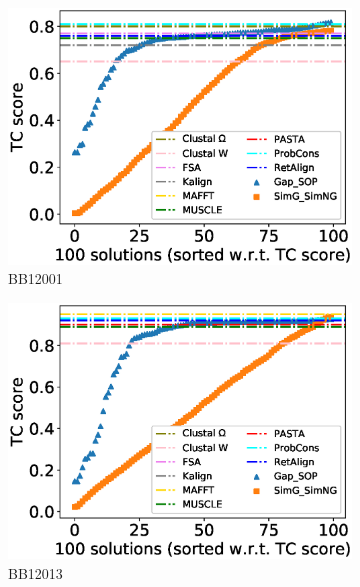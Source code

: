 \begin{figure}[!htbp]
	\centering
	\begin{adjustwidth}{-1.5cm}{-1cm}
		\begin{subfigure}{0.22\textwidth}
			\includegraphics[width=\columnwidth]{Figure/summary/precomputedInit/Balibase/BB12001_tc_density_single_run_2}
			\caption{BB12001}
		\end{subfigure}	
		\begin{subfigure}{0.22\textwidth}
			\includegraphics[width=\columnwidth]{Figure/summary/precomputedInit/Balibase/BB12013_tc_density_single_run_2}
			\caption{BB12013}
		\end{subfigure}
		\begin{subfigure}{0.22\textwidth}

\end{subfigure}
\end{adjustwidth}
\end{figure}
